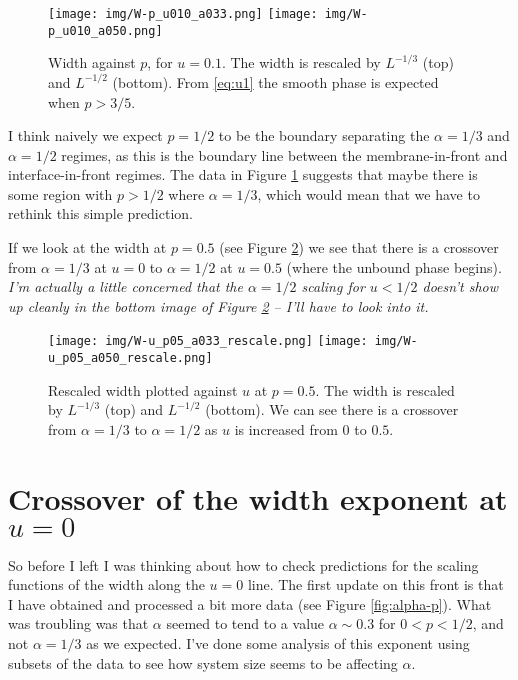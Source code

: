 \documentclass[a4paper,10pt]{article}
\newcommand{\fref}[1]{Figure \ref{#1}}
\begin{document}
\begin{figure}
 \centering
 \texttt{[image: img/W-p\_u010\_a033.png]}
 \texttt{[image: img/W-p\_u010\_a050.png]}
 \caption{Width against $p$, for $u=0.1$. The width is rescaled by $L^{-1/3}$ (top) and $L^{-1/2}$ (bottom). From \eqref{eq:u1} the smooth phase is expected when $p>3/5$.}
 \label{fig:W-p_u0.1}
\end{figure}

I think naively we expect $p=1/2$ to be the boundary separating the $\alpha=1/3$ and $\alpha=1/2$ regimes, as this is the boundary line between the membrane-in-front and interface-in-front regimes. The data in \fref{fig:W-p_u0.1} suggests that maybe there is some region with $p>1/2$ where $\alpha=1/3$, which would mean that we have to rethink this simple prediction.

If we look at the width at $p=0.5$ (see \fref{fig:W-u_p0.5}) we see that there is a crossover from $\alpha=1/3$ at $u = 0$ to $\alpha=1/2$ at $u=0.5$ (where the unbound phase begins). \emph{I'm actually a little concerned that the $\alpha=1/2$ scaling for $u<1/2$ doesn't show up cleanly in the bottom image of \fref{fig:W-u_p0.5} -- I'll have to look into it.}

\begin{figure}
 \centering
 \texttt{[image: img/W-u\_p05\_a033\_rescale.png]}
 \texttt{[image: img/W-u\_p05\_a050\_rescale.png]}
 \caption{Rescaled width plotted against $u$ at $p=0.5$. The width is rescaled by $L^{-1/3}$ (top) and $L^{-1/2}$ (bottom). We can see there is a crossover from $\alpha=1/3$ to $\alpha=1/2$ as $u$ is increased from $0$ to $0.5$.}
 \label{fig:W-u_p0.5}
\end{figure}

\newpage
\section{Crossover of the width exponent at $u=0$}

So before I left I was thinking about how to check predictions for the scaling functions of the width along the $u=0$ line. The first update on this front is that I have obtained and processed a bit more data (see \fref{fig:alpha-p}). What was troubling was that $\alpha$ seemed to tend to a value $\alpha \sim 0.3$ for $0 <p<1/2$, and not $\alpha = 1/3$ as we expected. I've done some analysis of this exponent using subsets of the data to see how system size seems to be affecting $\alpha$.
\end{document}
